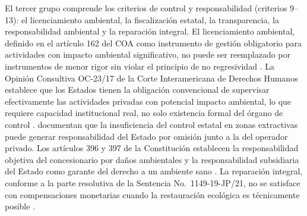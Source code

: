 El tercer grupo comprende los criterios de control y responsabilidad (criterios 9--13): el licenciamiento ambiental, la fiscalización estatal, la transparencia, la responsabilidad ambiental y la reparación integral. El licenciamiento ambiental, definido en el artículo 162 del COA como instrumento de gestión obligatorio para actividades con impacto ambiental significativo, no puede ser reemplazado por instrumentos de menor rigor sin violar el principio de no regresividad \parencite{coa_2017,reglamento_coa_2019}. La Opinión Consultiva OC-23/17 de la Corte Interamericana de Derechos Humanos establece que los Estados tienen la obligación convencional de supervisar efectivamente las actividades privadas con potencial impacto ambiental, lo que requiere capacidad institucional real, no solo existencia formal del órgano de control \parencite{corte_idh_oc23_2017}. \textcite{medina_garcia_2026} documentan que la insuficiencia del control estatal en zonas extractivas puede generar responsabilidad del Estado por omisión junto a la del operador privado. Los artículos 396 y 397 de la Constitución establecen la responsabilidad objetiva del concesionario por daños ambientales y la responsabilidad subsidiaria del Estado como garante del derecho a un ambiente sano \parencite{cre_2008}. La reparación integral, conforme a la parte resolutiva de la Sentencia No.\ 1149-19-JP/21, no se satisface con compensaciones monetarias cuando la restauración ecológica es técnicamente posible \parencite{cce_1149_19_jp_21,cedec_guia_2023}.

